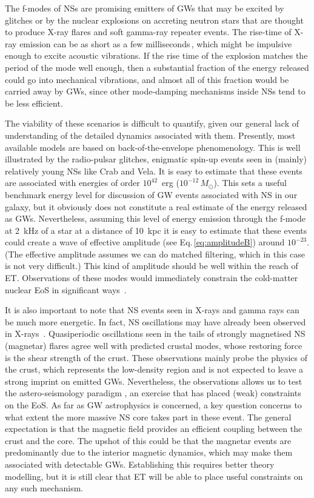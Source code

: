 The f-modes of NSs are promising emitters of GWs that may be excited 
by glitches or by the nuclear explosions on accreting neutron stars that 
are thought to produce X-ray flares and soft gamma-ray repeater events. 
The rise-time of X-ray emission can be as short as a few 
milliseconds\,\cite{2008Kes75}, which might be impulsive enough to excite 
acoustic vibrations. If the rise time of the explosion matches the period 
of the mode well enough, then a substantial fraction 
of the energy released could go into mechanical vibrations, and almost all of this 
fraction would be carried away by GWs, since other mode-damping mechanisms 
inside NSs tend to be less efficient. 

The viability of these scenarios is difficult to quantify, given our general 
lack of understanding of the detailed dynamics associated with them. 
Presently, most available models are based on back-of-the-envelope 
phenomenology. This is well illustrated by the radio-pulsar glitches, 
enigmatic spin-up events seen in (mainly) relatively young NSs like Crab and Vela. 
It is easy to estimate that these events are associated with energies of 
order $ 10^{42}$~erg ($10^{-12}\,M_\odot$). This sets a useful benchmark 
energy level for discussion of GW events associated with NS in our galaxy, 
but it obviously does not constitute a real estimate of the energy 
released as GWs.  Nevertheless, assuming this level of energy emission 
through the f-mode at 2~kHz of a star at a distance of 10~kpc it is easy 
to estimate that these events could create a wave of effective amplitude 
(see Eq.\,\ref{eq:amplitudeB}) around $10^{-23}$. (The effective amplitude 
assumes we can do matched filtering, which in this case is not very 
difficult.) This kind of amplitude should be well within the reach of ET.  
Observations of these modes would immediately constrain the cold-matter 
nuclear EoS in significant ways~\cite{AnderssonKokkotas1998, Living:AnderssonComer}.

It is also important to note that NS events seen in X-rays and gamma rays 
can be much more energetic.  In fact, NS oscillations may have already been 
observed in X-rays~\cite{WattsStrohmayer2007}. Quasiperiodic oscillations 
seen in the tails of strongly magnetised NS (magnetar) flares agree well 
with predicted crustal modes, whose restoring force is the shear strength 
of the crust. These observations mainly probe  the physics of the crust, 
which represents the low-density region and is not expected to leave a 
strong imprint on emitted GWs. Nevertheless, the observations 
allows us to test the astero-seismology paradigm \cite{Samuelsson:2007}, 
an exercise that has placed (weak) constraints on the EoS. As far as GW 
astrophysics is concerned, a key question concerns to what extent the 
more massive NS core takes part in these event. The general expectation 
is that the magnetic field provides an efficient coupling 
between the crust and the core. The upshot of this could be that the 
magnetar events are predominantly due to the interior magnetic dynamics, 
which may make them associated with detectable GWs. Establishing this 
requires better theory modelling, but it is still clear that ET will 
be able to place useful constraints on any such mechanism.


